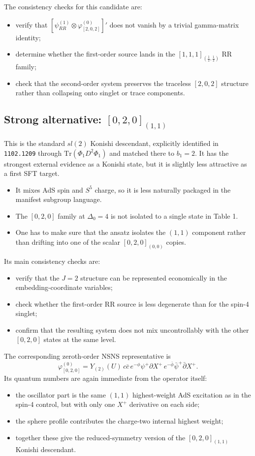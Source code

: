 \documentclass[12pt]{article}
\def\be{\begin{equation}}
\def\ee{\end{equation}}
\newcommand{\D}{\ensuremath{\Delta}}
\newcommand{\Tr}{\mathrm{Tr}}
\begin{document}
The consistency checks for this candidate are:
\begin{itemize}
\item verify that $[\psi^{(1)}_{RR}\otimes \varphi^{(0)}_{[2,0,2]}]'$ does not vanish by a trivial gamma-matrix identity;
\item determine whether the first-order source lands in the $[1,1,1]_{(\frac{1}{2},\frac{1}{2})}$ RR family;
\item check that the second-order system preserves the traceless $[2,0,2]$ structure rather than collapsing onto singlet or trace components.
\end{itemize}

\subsection{Strong alternative: \texorpdfstring{$[0,2,0]_{(1,1)}$}{[0,2,0](1,1)}}

This is the standard $sl(2)$ Konishi descendant, explicitly identified in \texttt{1102.1209} through
$\Tr(\Phi_1 D^2\Phi_1)$ and matched there to $b_1=2$.
It has the strongest external evidence as a Konishi state, but it is slightly less attractive as a first SFT target.
\begin{itemize}
\item It mixes AdS spin and $S^5$ charge, so it is less naturally packaged in the manifest subgroup language.
\item The $[0,2,0]$ family at $\D_0=4$ is not isolated to a single state in Table 1.
\item One has to make sure that the ansatz isolates the $(1,1)$ component rather than drifting into one of the scalar $[0,2,0]_{(0,0)}$ copies.
\end{itemize}

Its main consistency checks are:
\begin{itemize}
\item verify that the $J=2$ structure can be represented economically in the embedding-coordinate variables;
\item check whether the first-order RR source is less degenerate than for the spin-4 singlet;
\item confirm that the resulting system does not mix uncontrollably with the other $[0,2,0]$ states at the same level.
\end{itemize}

The corresponding zeroth-order NSNS representative is
\be
\varphi^{(0)}_{[0,2,0]}
=Y_{(2)}(U)\, c\bar c\,
e^{-\phi}\psi^+\partial X^+\,
e^{-\bar\phi}\bar\psi^+\bar\partial X^+.
\label{020vertex}
\ee
Its quantum numbers are again immediate from the operator itself:
\begin{itemize}
\item the oscillator part is the same $(1,1)$ highest-weight AdS excitation as in the spin-4 control,
but with only one $X^+$ derivative on each side;
\item the sphere profile contributes the charge-two internal highest weight;
\item together these give the reduced-symmetry version of the $[0,2,0]_{(1,1)}$ Konishi descendant.
\end{itemize}
\end{document}
